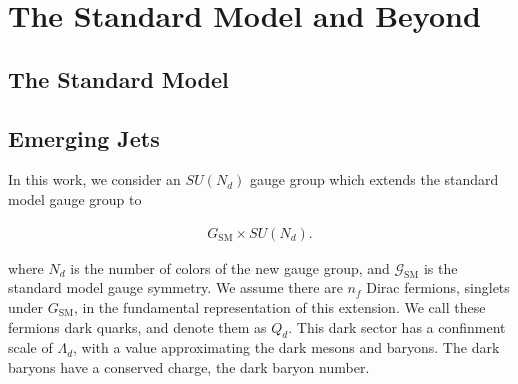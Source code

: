 \chapter{The Standard Model and Beyond}

\section{The Standard Model}


\section{Emerging Jets}

In this work, we consider an $SU(N_d)$ gauge group which extends the standard model gauge group to

\begin{equation}
	\begin{aligned}
		G_{\text{SM}} \times SU(N_d).
	\end{aligned}
\end{equation}

where $N_d$ is the number of colors of the new gauge group, and $\mathcal{G}_{\text{SM}}$ is the standard model gauge symmetry. We assume there are $n_f$ Dirac fermions, singlets under $G_{\text{SM}}$, in the fundamental representation of this extension. We call these fermions dark quarks, and denote them as $Q_d$. This dark sector has a confinment scale of $\Lambda_d$, with a value approximating the dark mesons and baryons. The dark baryons have a conserved charge, the dark baryon number.
